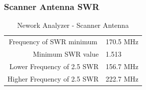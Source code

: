 \documentclass{article}
\begin{document}
\subsubsection{Scanner Antenna SWR}
\begin{table}[H]
	\begin{tabular}{rl}
	\multicolumn{1}{c}{Frequency of SWR minimum} & 170.5 MHz \\
	Minimum SWR value                            & 1.513     \\
	Lower Frequency of 2.5 SWR                   & 156.7 MHz \\
	Higher Frequency of 2.5 SWR                  & 222.7 MHz            
	\end{tabular}
	\caption{Nework Analyzer - Scanner Antenna}
	\label{}
\end{table}
\end{document}
